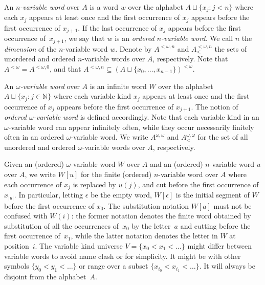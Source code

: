 \documentclass{article}
\numberwithin{theorem}{section}
\newcommand{\NN}{\mathbb{N}}
\begin{document}
An \emph{$n$-variable word} over $A$ is a word $w$ over the alphabet $A \sqcup \{ x_j : j < n \}$ where each $x_j$ appears at least once and the first occurrence of $x_j$ appears before the first occurrence of $x_{j+1}$. If the last occurrence of $x_j$ appears before the first occurrence of~$x_{j+1}$, we say that $w$ is an \emph{ordered $n$-variable word}. We call $n$ the \emph{dimension} of the $n$-variable word $w$. 
Denote by $A^{<\omega, n}$ and $A^{<\omega, n}_{<}$ the sets of unordered and ordered $n$-variable words over $A$, respectively. Note that $A^{<\omega} = A^{<\omega, 0}$, and that $A^{<\omega, n} \subseteq (A \sqcup \{x_0, \dots, x_{n-1}\})^{<\omega}$.

An \emph{$\omega$-variable word} over $A$ is an infinite word $W$ over the alphabet $A \sqcup \{ x_j : j \in \NN \}$ where each variable kind $x_j$ appears at least once and the first occurrence of $x_j$ appears before the first occurrence of $x_{j+1}$. The notion of \emph{ordered $\omega$-variable word} is defined accordingly. Note that each variable kind in an $\omega$-variable word can appear infinitely often, while they occur necessarily finitely often in an ordered $\omega$-variable word. We write $A^{\omega, \omega}$ and $A^{\omega, \omega}_{<}$ for the set of all unordered and ordered $\omega$-variable words over $A$, respectively.

Given an (ordered) $\omega$-variable word $W$ over $A$ and an (ordered) $n$-variable word $u$ over $A$, we write $W[u]$ for the finite (ordered) $n$-variable word over $A$ where each occurrence of $x_j$ is replaced by $u(j)$, and cut before the first occurrence of $x_{|u|}$. In particular, letting $\epsilon$ be the empty word, $W[\epsilon]$ is the initial segment of $W$ before the first occurrence of $x_0$. The substitution notation $W[a]$ must not be confused with $W(i)$: the former notation denotes the finite word obtained by substitution of all the occurrences of~$x_0$ by the letter~$a$ and cutting before the first occurrence of~$x_1$, while the latter notation denotes the letter in $W$ at position~$i$. The variable kind universe $V = \{ x_0 < x_1 < \dots \}$ might differ between variable words to avoid name clash or for simplicity. It might be with other symbols $\{ y_0 < y_1 < \dots \}$ or range over a subset $\{ x_{i_0} < x_{i_1} < \dots \}$. It will always be disjoint from the alphabet~$A$.

\end{document}
